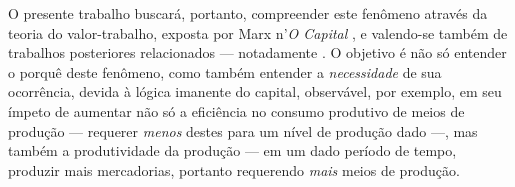 \documentclass{article}[12pt]
\begin{document}
O presente trabalho buscará, portanto, compreender este fenômeno através da teoria do valor-trabalho, exposta por Marx n'\textit{O Capital} \cite{Marx2017a, Marx2014, Marx2017}, e valendo-se também de trabalhos posteriores relacionados --- notadamente \cite{SaBarreto2018}. O objetivo é não só entender o porquê deste fenômeno, como também entender a \textit{necessidade} de sua ocorrência, devida à lógica imanente do capital, observável, por exemplo, em seu ímpeto de aumentar não só a eficiência no consumo produtivo de meios de produção --- requerer \textit{menos} destes para um nível de produção dado ---, mas também a produtividade da produção --- em um dado período de tempo, produzir mais mercadorias, portanto requerendo \textit{mais} meios de produção. 


\end{document}
